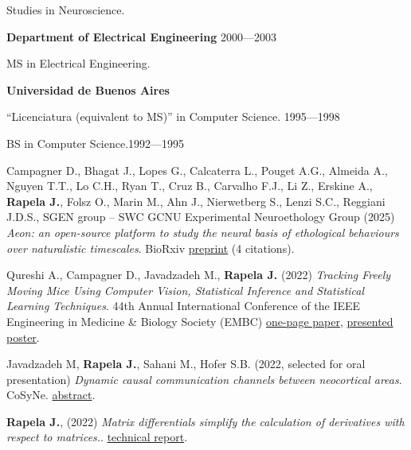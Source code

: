 \documentclass{article}
\begin{document}
\par
Studies in Neuroscience.

\vspace{.05in}
{\bf Department of Electrical Engineering} \hspace*{\fill} 2000---2003

\par
MS in Electrical Engineering.

\par
\vspace{.1in}
{\bf Universidad de Buenos Aires}
\par
``Licenciatura (equivalent to MS)'' in Computer Science.
\hfill 1995---1998
\par
BS in Computer Science.\hfill 1992---1995

\par
\vspace{2\baselineskip}
\par
{}
Campagner D., Bhagat J., Lopes G., Calcaterra L., Pouget A.G., Almeida A., Nguyen T.T.,  Lo C.H.,  Ryan T., Cruz B., Carvalho F.J., Li Z., Erskine A.,  \textbf{Rapela J.},  Folsz O., Marin M., Ahn J.,  Nierwetberg S.,  Lenzi S.C.,  Reggiani J.D.S., SGEN group – SWC GCNU Experimental Neuroethology Group (2025)
\textit{Aeon: an open-source platform to study the neural basis of ethological behaviours over naturalistic timescales}.
BioRxiv
\href{https://www.biorxiv.org/content/biorxiv/early/2025/08/01/2025.07.31.664513.full.pdf}{preprint} (4 citations).

\par
Qureshi A., Campagner D., Javadzadeh M., \textbf{Rapela J.} (2022)
\textit{Tracking Freely Moving Mice Using Computer Vision, Statistical Inference
and Statistical Learning Techniques}.
44th Annual International Conference of the IEEE Engineering in Medicine \&
Biology Society (EMBC)
\href{http://www.gatsby.ucl.ac.uk/~rapela/posters/EMBC22_1882_MS.pdf}{one-page
paper},
\href{http://www.gatsby.ucl.ac.uk/~rapela/posters/EMBC22_1882_poster.pdf}{presented
poster}.

\par
Javadzadeh M, \textbf{Rapela J.}, Sahani M., Hofer S.B. (2022, selected for oral presentation)
\textit{Dynamic causal communication channels between neocortical areas}.
CoSyNe.
\href{http://www.gatsby.ucl.ac.uk/~rapela/mitra/abstracts/cosyne21/cosyne_abstract_Javadzadeh.pdf}{abstract}.

\par
\textbf{Rapela J.}, (2022)
\textit{Matrix differentials simplify the calculation of derivatives with
respect to matrices.}.
\href{http://www.gatsby.ucl.ac.uk/~rapela/papers/ppcaLLmatrixDerivatives.pdf}{technical report}.
\end{document}
